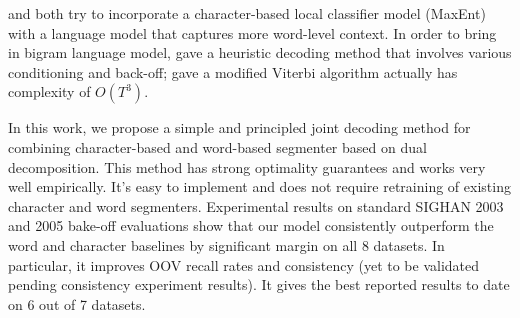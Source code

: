 \cite{Lin:2009:CICLing} and \cite{Wang:2006:SIGHAN} both try to incorporate a character-based local classifier model (MaxEnt) with a language model that captures more word-level context.
In order to bring in bigram language model,   gave a heuristic decoding method that involves various conditioning and back-off;  gave a modified Viterbi algorithm actually has complexity of $O(T^3)$. 

In this work, we propose a simple and principled joint decoding method for combining character-based and word-based segmenter based on dual decomposition. This method has strong optimality guarantees and works very well empirically. It's easy to implement and does not require retraining of existing character and word segmenters.
Experimental results on standard SIGHAN 2003 and 2005 bake-off evaluations show that our model consistently outperform the word and character baselines by significant margin on all 8 datasets. In particular, it improves OOV recall rates and consistency (yet to be validated pending consistency experiment results). It gives the best reported results to date on 6 out of 7 datasets. 

